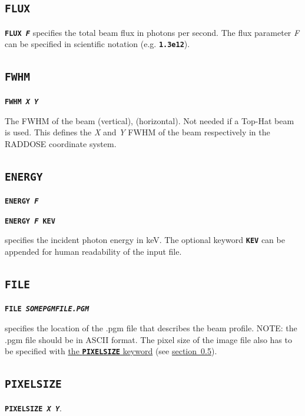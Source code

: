 \documentclass[a4paper]{article}
\newcommand{\Keyword}[1]{\texttt{\textbf{#1}}\xspace}
\newcommand{\SB}{\\[0.2em]}
\begin{document}
\subsection{\Keyword{FLUX}}
\label{flux}

\noindent \Keyword{FLUX \textit{F}} specifies the total beam flux in photons per second. The flux parameter \textit{F} can be specified in scientific notation (e.g. \Keyword{1.3e12}).


\subsection{\Keyword{FWHM}}

\label{beamfwhm}
\noindent \Keyword{FWHM \textit{X Y}}

The FWHM of the beam (vertical), (horizontal). Not needed if a Top-Hat beam is used.
This defines the \textit{X} and \textit{Y} FWHM of the beam respectively in the RADDOSE coordinate system.


\subsection{\Keyword{ENERGY}}

\noindent \Keyword{ENERGY \textit{F}}

\noindent \Keyword{ENERGY \textit{F} KEV}

specifies the incident photon energy in keV. The optional keyword \Keyword{KEV} can be appended for human readability of the input file.

\subsection{\Keyword{FILE}}
\label{file}

\noindent \Keyword{FILE \textit{SOMEPGMFILE.PGM}}

specifies the location of the .pgm file that describes the beam profile. NOTE: the .pgm file should be in ASCII format. The pixel size of the image file also has to be specified with \hyperref[pixelsize]{the \Keyword{PIXELSIZE} keyword} (see \hyperref[pixelsize]{section~\ref*{pixelsize}}).\SB

\subsection{\Keyword{PIXELSIZE}}
\label{pixelsize}

\noindent \Keyword{PIXELSIZE \textit{X Y}}.
\end{document}
